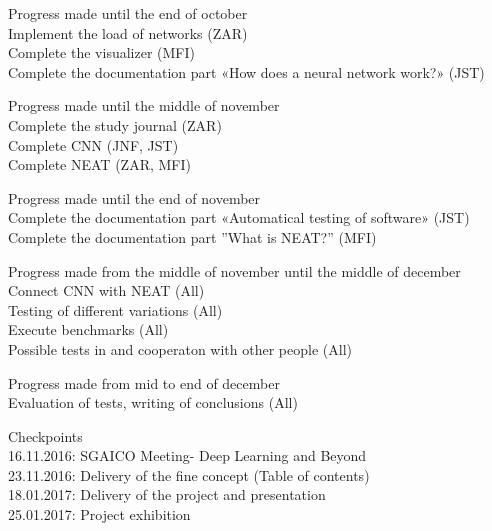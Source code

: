 Progress made until the end of october\\
Implement the load of networks (ZAR)\\
Complete the visualizer (MFI)\\ 
Complete the documentation part «How does a neural network work?» (JST)

Progress made until the middle of november\\
Complete the study journal (ZAR)\\
Complete CNN (JNF, JST)\\
Complete NEAT (ZAR, MFI)

Progress made until the end of november\\
Complete the documentation part «Automatical testing of software» (JST)\\ Complete the documentation part ”What is NEAT?” (MFI)

Progress made from the middle of november until the middle of december\\
Connect CNN with NEAT (All)\\
Testing of different variations (All)\\
Execute benchmarks (All)\\
Possible tests in and cooperaton with other people (All)

Progress made from mid to end of december\\
Evaluation of tests, writing of conclusions (All)

Checkpoints\\
16.11.2016: SGAICO Meeting- Deep Learning and Beyond\\
23.11.2016: Delivery of the fine concept (Table of contents)\\
18.01.2017: Delivery of the project and presentation\\
25.01.2017: Project exhibition\\

